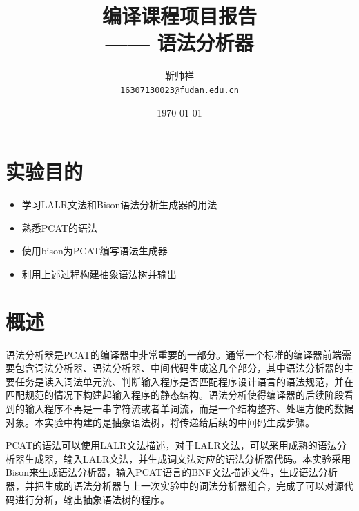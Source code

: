 \documentclass{article}
\title{编译课程项目报告 \\ \large{—— 语法分析器}} %
\author{靳帅祥\\ \texttt{16307130023@fudan.edu.cn}} %
\date{\today} %
\begin{document}
\maketitle %

\tableofcontents

\newpage


\section{实验目的} %

\begin{itemize}
\setlength{\itemsep}{0pt}
\setlength{\parsep}{0pt}
\setlength{\parskip}{0pt}
    \item 学习LALR文法和Bison语法分析生成器的用法
    \item 熟悉PCAT的语法
    \item 使用bison为PCAT编写语法生成器
    \item 利用上述过程构建抽象语法树并输出
\end{itemize}


\section{概述} %

语法分析器是PCAT的编译器中非常重要的一部分。通常一个标准的编译器前端需要包含词法分析器、语法分析器、中间代码生成这几个部分，其中语法分析器的主要任务是读入词法单元流、判断输入程序是否匹配程序设计语言的语法规范，并在匹配规范的情况下构建起输入程序的静态结构。语法分析使得编译器的后续阶段看到的输入程序不再是一串字符流或者单词流，而是一个结构整齐、处理方便的数据对象。本实验中构建的是抽象语法树，将传递给后续的中间码生成步骤。

PCAT的语法可以使用LALR文法描述，对于LALR文法，可以采用成熟的语法分析器生成器，输入LALR文法，并生成词文法对应的语法分析器代码。本实验采用Bison来生成语法分析器，输入PCAT语言的BNF文法描述文件，生成语法分析器，并把生成的语法分析器与上一次实验中的词法分析器组合，完成了可以对源代码进行分析，输出抽象语法树的程序。
\end{document}
